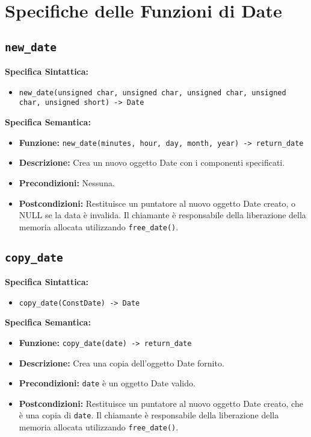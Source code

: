 \documentclass{article}
\begin{document}
\section{Specifiche delle Funzioni di Date}

\subsection{\texttt{new\_date}}

\textbf{Specifica Sintattica:}
\begin{itemize}
    \item \texttt{new\_date(unsigned char, unsigned char, unsigned char, unsigned char, unsigned short) -> Date}
\end{itemize}

\textbf{Specifica Semantica:}
\begin{itemize}
    \item \textbf{Funzione:} \texttt{new\_date(minutes, hour, day, month, year) -> return\_date}
    \item \textbf{Descrizione:} Crea un nuovo oggetto Date con i componenti specificati.
    \item \textbf{Precondizioni:} Nessuna.
    \item \textbf{Postcondizioni:} Restituisce un puntatore al nuovo oggetto Date creato, o NULL se la data è invalida. Il chiamante è responsabile della liberazione della memoria allocata utilizzando \texttt{free\_date()}.
\end{itemize}

\subsection{\texttt{copy\_date}}

\textbf{Specifica Sintattica:}
\begin{itemize}
    \item \texttt{copy\_date(ConstDate) -> Date}
\end{itemize}

\textbf{Specifica Semantica:}
\begin{itemize}
    \item \textbf{Funzione:} \texttt{copy\_date(date) -> return\_date}
    \item \textbf{Descrizione:} Crea una copia dell'oggetto Date fornito.
    \item \textbf{Precondizioni:} \texttt{date} è un oggetto Date valido.
    \item \textbf{Postcondizioni:} Restituisce un puntatore al nuovo oggetto Date creato, che è una copia di \texttt{date}. Il chiamante è responsabile della liberazione della memoria allocata utilizzando \texttt{free\_date()}.
\end{itemize}
\end{document}
